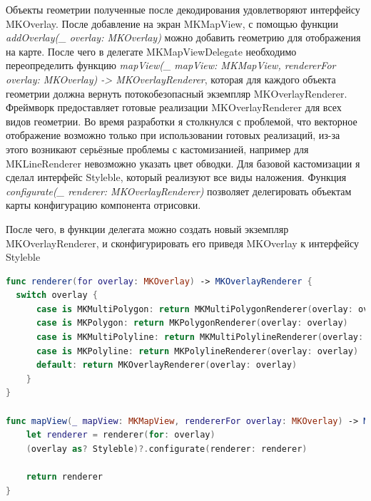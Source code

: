       Объекты геометрии полученные после декодирования удовлетворяют интерфейсу MKOverlay. После добавление на экран MKMapView, с помощью функции \textit{addOverlay(\_ overlay: MKOverlay)} можно добавить геометрию для отображения на карте. После чего в делегате MKMapViewDelegate необходимо переопределить функцию \textit{mapView(\_ mapView: MKMapView, rendererFor overlay: MKOverlay) -> MKOverlayRenderer}, которая для каждого объекта геометрии должна вернуть потокобезопасный экземпляр MKOverlayRenderer. Фреймворк предоставляет готовые реализации MKOverlayRenderer для всех видов геометрии. Во время разработки я столкнулся с проблемой, что векторное отображение возможно только при использовании готовых реализаций, из-за этого возникают серьёзные проблемы с кастомизанией, например для MKLineRenderer невозможно указать цвет обводки.
      Для базовой кастомизации я сделал интерфейс Styleble, который реализуют все виды наложения. Функция \textit{configurate(\_ renderer: MKOverlayRenderer)} позволяет делегировать объектам карты конфигурацию компонента отрисовки.


      После чего, в функции делегата можно создать новый экземпляр MKOverlayRenderer, и сконфигурировать его приведя MKOverlay к интерфейсу Styleble

      \begin{lstlisting}[language=swift,caption={Реализация функции создания и конфигурации компонентов MKOverlayRenderer}]
func renderer(for overlay: MKOverlay) -> MKOverlayRenderer {
  switch overlay {
      case is MKMultiPolygon: return MKMultiPolygonRenderer(overlay: overlay)
      case is MKPolygon: return MKPolygonRenderer(overlay: overlay)
      case is MKMultiPolyline: return MKMultiPolylineRenderer(overlay: overlay)
      case is MKPolyline: return MKPolylineRenderer(overlay: overlay)
      default: return MKOverlayRenderer(overlay: overlay)
    }
}

func mapView(_ mapView: MKMapView, rendererFor overlay: MKOverlay) -> MKOverlayRenderer {
    let renderer = renderer(for: overlay)
    (overlay as? Styleble)?.configurate(renderer: renderer)

    return renderer
}
      \end{lstlisting}

